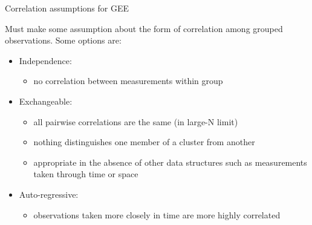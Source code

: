 \documentclass[
  ignorenonframetext,
]{beamer}
\providecommand{\tightlist}{%
  \setlength{\itemsep}{0pt}\setlength{\parskip}{0pt}}
\begin{document}
\begin{frame}{Correlation assumptions for GEE}
\protect\hypertarget{correlation-assumptions-for-gee}{}

Must make some assumption about the form of correlation among grouped
observations. Some options are:

\begin{itemize}
\tightlist
\item
  Independence:

  \begin{itemize}
  \tightlist
  \item
    no correlation between measurements within group
  \end{itemize}
\item
  Exchangeable:

  \begin{itemize}
  \tightlist
  \item
    all pairwise correlations are the same (in large-N limit)
  \item
    nothing distinguishes one member of a cluster from another
  \item
    appropriate in the absence of other data structures such as
    measurements taken through time or space
  \end{itemize}
\item
  Auto-regressive:

  \begin{itemize}
  \tightlist
  \item
    observations taken more closely in time are more highly correlated
  \end{itemize}
\end{itemize}

\end{frame}
\end{document}
